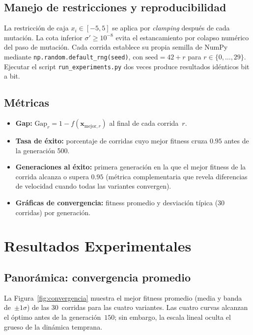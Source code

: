 \documentclass[12pt,letterpaper]{article}
\begin{document}
\subsection{Manejo de restricciones y reproducibilidad}

La restricción de caja $x_i\in[-5,5]$ se aplica por \textit{clamping} después de cada mutación. La cota inferior $\sigma'\geq 10^{-8}$ evita el estancamiento por colapso numérico del paso de mutación. Cada corrida establece su propia semilla de NumPy mediante \texttt{np.random.default\_rng(seed)}, con $\text{seed}=42+r$ para $r\in\{0,\dots,29\}$. Ejecutar el script \texttt{run\_experiments.py} dos veces produce resultados idénticos bit a bit.

\subsection{Métricas}

\begin{itemize}[leftmargin=2.2em, itemsep=3pt]
    \item \textbf{Gap:} $\text{Gap}_r = 1 - f(\mathbf{x}_{\text{mejor},r})$ al final de cada corrida~$r$.
    \item \textbf{Tasa de éxito:} porcentaje de corridas cuyo mejor fitness cruza $0.95$ antes de la generación 500.
    \item \textbf{Generaciones al éxito:} primera generación en la que el mejor fitness de la corrida alcanza o supera $0.95$ (métrica complementaria que revela diferencias de velocidad cuando todas las variantes convergen).
    \item \textbf{Gráficas de convergencia:} fitness promedio y desviación típica (30 corridas) por generación.
\end{itemize}

\newpage
\section{Resultados Experimentales}

\subsection{Panorámica: convergencia promedio}

La Figura~\ref{fig:convergencia} muestra el mejor fitness promedio (media y banda de~$\pm 1\sigma$) de las 30~corridas para las cuatro variantes. Las cuatro curvas alcanzan el óptimo antes de la generación~$150$; sin embargo, la escala lineal oculta el grueso de la dinámica temprana.
\end{document}
